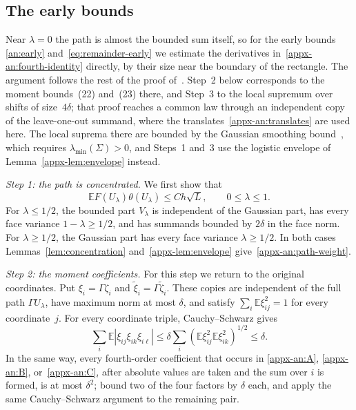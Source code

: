 \documentclass[11pt,letterpaper]{article}
\newif\ifshowrev
\newcommand{\rev}[1]{\ifshowrev{\color{revblue}%
\hypersetup{linkcolor=revblue,citecolor=revblue,urlcolor=revblue}#1}\else#1\fi}
\newenvironment{revblock}{\ifshowrev\color{revblue}%
\hypersetup{linkcolor=revblue,citecolor=revblue,urlcolor=revblue}\fi}{}
\newif\ifshowtrim
\newcommand{\trim}[1]{\ifshowtrim{\color{revblue}%
\hypersetup{linkcolor=revblue,citecolor=revblue,urlcolor=revblue}#1}\else#1\fi}
\newif\ifshownat
\newcommand{\nat}[1]{\ifshownat{\color{revblue}%
\hypersetup{linkcolor=revblue,citecolor=revblue,urlcolor=revblue}#1}\else#1\fi}
\theoremstyle{remark}
\newcommand{\E}{\mathbb E}
\begin{document}
\begin{revblock}
\subsection{The early bounds}
\label{appx-an:sec:early}

Near \(\lambda=0\) the path is almost the bounded sum itself, so for the
early bounds \eqref{an:early} and~\eqref{eq:remainder-early} we estimate
the derivatives in~\eqref{appx-an:fourth-identity} directly, by their
size near the boundary of the rectangle. \rev{The argument follows the
\nat{rest of the proof of~\cite[Lemma~4.1]{AL}. Step~2 below corresponds to the moment bounds~(22) and~(23) there, and Step~3 to the local supremum over shifts of size~\(4\delta\); that proof reaches a common law through an independent copy of the leave-one-out summand, where the translates~\eqref{appx-an:translates} are used here. The local suprema there are bounded by the Gaussian smoothing bound~\cite[Corollary~3.2]{AL}, which requires}
\(\lambda_{\min}(\Sigma)>0\), and Steps~1 and~3 use the logistic
envelope of Lemma~\ref{appx-lem:envelope} instead.}

\emph{Step 1: the path is concentrated.} We first show that
\begin{equation}
 \E F(U_\lambda)\theta(U_\lambda)\le Ch\sqrt L,
 \qquad 0\le\lambda\le1.
 \label{appx-an:path-weight}
\end{equation}
For \(\lambda\le1/2\), the bounded part \(V_\lambda\) is independent of
the Gaussian part, has every face variance \(1-\lambda\ge1/2\), and has
summands bounded by \(2\delta\) in the face norm. For \(\lambda\ge1/2\), the
Gaussian part has every face variance \(\lambda\ge1/2\). In both cases
Lemmas~\ref{lem:concentration} and~\ref{appx-lem:envelope}
give~\eqref{appx-an:path-weight}.

\emph{Step 2: the moment coefficients.} For this step we return to the
original coordinates. Put \(\xi_i=\Gamma\zeta_i\) and
\(\widetilde\xi_i=\Gamma\widetilde\zeta_i\). These \trim{copies} are
independent of the full path \(\Gamma U_\lambda\), have maximum norm at
most \(\delta\), and satisfy \(\sum_i\E\xi_{ij}^2=1\) for every
coordinate~\(j\). For every coordinate triple, Cauchy--Schwarz gives
\[
 \sum_i\E|\xi_{ij}\xi_{ik}\xi_{i\ell}|
 \le\delta\sum_i(\E\xi_{ij}^2\E\xi_{ik}^2)^{1/2}
 \le\delta.
\]
In the same way, every fourth-order coefficient that occurs in
\eqref{appx-an:A}, \eqref{appx-an:B}, or~\eqref{appx-an:C}, after
absolute values are taken and the sum over \(i\) is formed, is at most
\(\delta^2\); bound two of the four factors by \(\delta\) each, and
apply the same Cauchy--Schwarz argument to the remaining pair.


\end{revblock}
\end{document}
